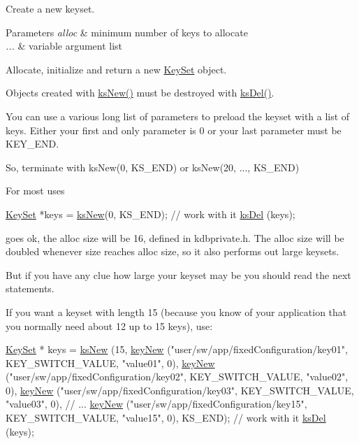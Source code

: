 Create a new keyset. 


\begin{DoxyParams}{Parameters}
{\em alloc} & minimum number of keys to allocate \\
\hline
{\em ...} & variable argument list\\
\hline
\end{DoxyParams}
Allocate, initialize and return a new \hyperlink{classkdb_1_1KeySet}{Key\-Set} object.

Objects created with \hyperlink{group__keyset_ga671e1aaee3ae9dc13b4834a4ddbd2c3c}{ks\-New()} must be destroyed with \hyperlink{group__keyset_ga27e5c16473b02a422238c8d970db7ac8}{ks\-Del()}.

You can use a various long list of parameters to preload the keyset with a list of keys. Either your first and only parameter is 0 or your last parameter must be K\-E\-Y\-\_\-\-E\-N\-D.

So, terminate with ks\-New(0, K\-S\-\_\-\-E\-N\-D) or ks\-New(20, ..., K\-S\-\_\-\-E\-N\-D)

For most uses 
\begin{DoxyCode}
\hyperlink{classkdb_1_1KeySet_a4eac9850fa4f06c07a5306befc3e4377}{KeySet} *keys = \hyperlink{group__keyset_ga671e1aaee3ae9dc13b4834a4ddbd2c3c}{ksNew}(0, KS\_END);
\textcolor{comment}{// work with it}
\hyperlink{group__keyset_ga27e5c16473b02a422238c8d970db7ac8}{ksDel} (keys);
\end{DoxyCode}
 goes ok, the alloc size will be 16, defined in kdbprivate.\-h. The alloc size will be doubled whenever size reaches alloc size, so it also performs out large keysets.

But if you have any clue how large your keyset may be you should read the next statements.

If you want a keyset with length 15 (because you know of your application that you normally need about 12 up to 15 keys), use\-: 
\begin{DoxyCode}
\hyperlink{classkdb_1_1KeySet_a4eac9850fa4f06c07a5306befc3e4377}{KeySet} * keys = \hyperlink{group__keyset_ga671e1aaee3ae9dc13b4834a4ddbd2c3c}{ksNew} (15,
        \hyperlink{group__key_gad23c65b44bf48d773759e1f9a4d43b89}{keyNew} (\textcolor{stringliteral}{"user/sw/app/fixedConfiguration/key01"}, KEY\_SWITCH\_VALUE,
       \textcolor{stringliteral}{"value01"}, 0),
        \hyperlink{group__key_gad23c65b44bf48d773759e1f9a4d43b89}{keyNew} (\textcolor{stringliteral}{"user/sw/app/fixedConfiguration/key02"}, KEY\_SWITCH\_VALUE,
       \textcolor{stringliteral}{"value02"}, 0),
        \hyperlink{group__key_gad23c65b44bf48d773759e1f9a4d43b89}{keyNew} (\textcolor{stringliteral}{"user/sw/app/fixedConfiguration/key03"}, KEY\_SWITCH\_VALUE,
       \textcolor{stringliteral}{"value03"}, 0),
        \textcolor{comment}{// ...}
        \hyperlink{group__key_gad23c65b44bf48d773759e1f9a4d43b89}{keyNew} (\textcolor{stringliteral}{"user/sw/app/fixedConfiguration/key15"}, KEY\_SWITCH\_VALUE,
       \textcolor{stringliteral}{"value15"}, 0),
        KS\_END);
\textcolor{comment}{// work with it}
\hyperlink{group__keyset_ga27e5c16473b02a422238c8d970db7ac8}{ksDel} (keys);
\end{DoxyCode}


